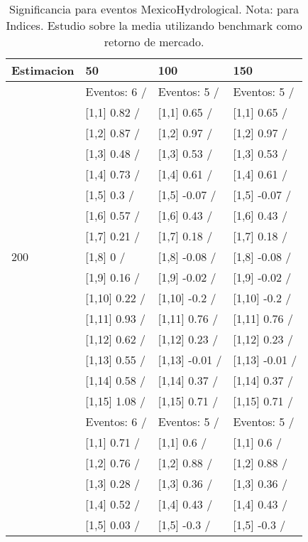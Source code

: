 \begin{table}

\caption{Significancia para eventos MexicoHydrological. Nota: para Indices. Estudio sobre la media utilizando benchmark como retorno de mercado.}
\centering
\begin{tabular}[t]{llll}
\toprule
Estimacion & 50 & 100 & 150\\
\midrule
 & Eventos:  6 / & Eventos:  5 / & Eventos:  5 /\\
 & {}[1,1] 0.82  / & {}[1,1] 0.65  / & {}[1,1] 0.65  /\\
 & {}[1,2] 0.87  / & {}[1,2] 0.97  / & {}[1,2] 0.97  /\\
 & {}[1,3] 0.48  / & {}[1,3] 0.53  / & {}[1,3] 0.53  /\\
 & {}[1,4] 0.73  / & {}[1,4] 0.61  / & {}[1,4] 0.61  /\\
\addlinespace
 & {}[1,5] 0.3  / & {}[1,5] -0.07  / & {}[1,5] -0.07  /\\
 & {}[1,6] 0.57  / & {}[1,6] 0.43  / & {}[1,6] 0.43  /\\
 & {}[1,7] 0.21  / & {}[1,7] 0.18  / & {}[1,7] 0.18  /\\
200 & {}[1,8] 0  / & {}[1,8] -0.08  / & {}[1,8] -0.08  /\\
 & {}[1,9] 0.16  / & {}[1,9] -0.02  / & {}[1,9] -0.02  /\\
\addlinespace
 & {}[1,10] 0.22  / & {}[1,10] -0.2  / & {}[1,10] -0.2  /\\
 & {}[1,11] 0.93  / & {}[1,11] 0.76  / & {}[1,11] 0.76  /\\
 & {}[1,12] 0.62  / & {}[1,12] 0.23  / & {}[1,12] 0.23  /\\
 & {}[1,13] 0.55  / & {}[1,13] -0.01  / & {}[1,13] -0.01  /\\
 & {}[1,14] 0.58  / & {}[1,14] 0.37  / & {}[1,14] 0.37  /\\
\addlinespace
 & {}[1,15] 1.08  / & {}[1,15] 0.71  / & {}[1,15] 0.71  /\\
 & Eventos:  6 / & Eventos:  5 / & Eventos:  5 /\\
 & {}[1,1] 0.71  / & {}[1,1] 0.6  / & {}[1,1] 0.6  /\\
 & {}[1,2] 0.76  / & {}[1,2] 0.88  / & {}[1,2] 0.88  /\\
 & {}[1,3] 0.28  / & {}[1,3] 0.36  / & {}[1,3] 0.36  /\\
\addlinespace
 & {}[1,4] 0.52  / & {}[1,4] 0.43  / & {}[1,4] 0.43  /\\
 & {}[1,5] 0.03  / & {}[1,5] -0.3  / & {}[1,5] -0.3  /\\

\end{tabular}
\end{table}
